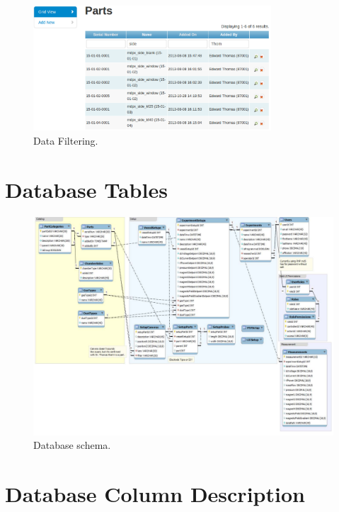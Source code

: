 \documentclass{sig-alternate}
\begin{document}
\begin{figure}[h]
\centering
\includegraphics[width=3.5in]{grid_filter.pdf}
\caption{Data Filtering.\label{fig:grid_filter}}
\end{figure}


\onecolumn
\appendix
\section{Database Tables}\label{app_db_schema}

\begin{figure}[h]
\centering
\includegraphics[width=6in]{schema.pdf}
\caption{Database schema.\label{fig:schema}}
\end{figure}


\twocolumn

\section{Database Column Description}
\end{document}
